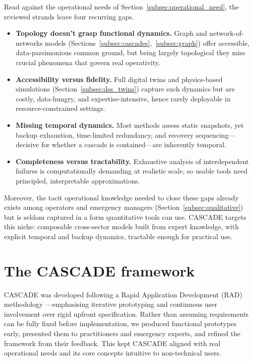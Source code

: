 \documentclass[review,12pt]{elsarticle}
\begin{document}
Read against the operational needs of Section~\ref{subsec:operational_need},
the reviewed strands leave four recurring gaps.

\begin{itemize}
  \item \textbf{Topology doesn't grasp functional dynamics.} Graph and network-of-networks models
  (Sections~\ref{subsec:cascades},~\ref{subsec:graph}) offer accessible, data-parsimonious
  common ground, but being largely topological they miss crucial phenomena that govern real operativity.

  \item \textbf{Accessibility versus fidelity.} Full digital twins and physics-based simulations (Section~\ref{subsec:dss_twins}) capture such dynamics but are costly, data-hungry, and expertise-intensive, hence rarely deployable in resource-constrained
  settings.

  \item \textbf{Missing temporal dynamics.} Most methods assess static snapshots, yet
  backup exhaustion, time-limited redundancy, and recovery sequencing---decisive for whether
  a cascade is contained---are inherently temporal.

  \item \textbf{Completeness versus tractability.} Exhaustive analysis of interdependent
  failures is computationally demanding at realistic scale, so usable tools need principled,
  interpretable approximations.
\end{itemize}

Moreover, the tacit operational knowledge needed to close these gaps already exists among
operators and emergency managers (Section~\ref{subsec:qualitative}) but is seldom captured in
a form quantitative tools can use. CASCADE targets this niche: composable cross-sector models
built from expert knowledge, with explicit temporal and backup dynamics, tractable enough for
practical use.



\section{The CASCADE framework}
\label{sec:cascade_context}

CASCADE was developed following a Rapid Application Development (RAD) methodology \cite{Beynon-Davies01091999}---emphasising iterative prototyping and continuous user involvement over rigid upfront specification. Rather than assuming requirements can be fully fixed before implementation, we produced functional prototypes early, presented them to practitioners and emergency experts, and refined the framework from their feedback. This kept CASCADE aligned with real operational needs and its core concepts intuitive to non-technical users.
\end{document}
